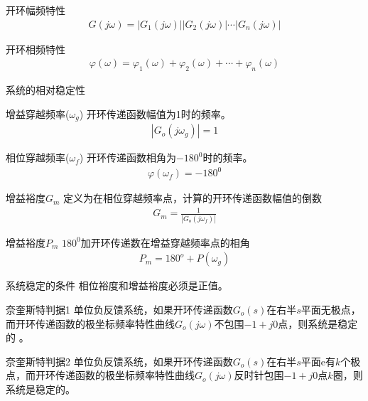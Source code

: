 \begin{frame}
\begin{block}{开环幅频特性}
 \begin{eqnarray*}
G(j\omega)=|G_1(j\omega)||G_2(j\omega)|\cdots |G_n(j\omega)|
\end{eqnarray*}
\end{block}
\begin{block}{开环相频特性}
 \begin{eqnarray*}
\varphi(\omega)=\varphi_1(\omega)+\varphi_2(\omega)+\cdots +\varphi_n(\omega)
\end{eqnarray*}
\end{block}
\end{frame}

\begin{frame}{系统的相对稳定性}
\begin{block}{增益穿越频率($\omega_g$)}
开环传递函数幅值为1时的频率。
 \begin{eqnarray*}
|G_o(j\omega_g)|=1
\end{eqnarray*}
\end{block}
\begin{block}{相位穿越频率($\omega_f$)}
开环传递函数相角为$-180^0$时的频率。
 \begin{eqnarray*}
\varphi(\omega_f)=-180^0
\end{eqnarray*}
\end{block}
\end{frame}

\begin{frame}
\begin{block}{增益裕度$G_m$}
定义为在相位穿越频率点，计算的开环传递函数幅值的倒数
 \begin{eqnarray*}
G_m=\frac{1}{|G_o(j\omega_f)|}
\end{eqnarray*}
\end{block}
\begin{block}{增益裕度$P_m$}
$180^0$加开环传递数在增益穿越频率点的相角
 \begin{eqnarray*}
P_m=180^o+P(\omega_g)
\end{eqnarray*}
\end{block}
\end{frame}

\begin{frame}
\begin{block}{系统稳定的条件}
相位裕度和增益裕度必须是正值。
\end{block}
\end{frame}

\begin{frame}
\begin{block}{奈奎斯特判据1}
单位负反馈系统，如果开环传递函数$G_o(s)$在右半$s$平面无极点，而开环传递函数的极坐标频率特性曲线$G_o(j\omega)$不包围$-1+j0$点，则系统是稳定的 。
\end{block}
\begin{block}{奈奎斯特判据2}
单位负反馈系统，如果开环传递函数$G_o(s)$在右半$s$平面e有$k$个极点，而开环传递函数的极坐标频率特性曲线$G_o(j\omega)$反时针包围$-1+j0$点$k$圈，则系统是稳定的。
\end{block}
\end{frame}